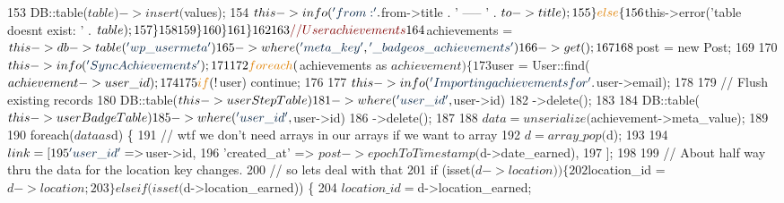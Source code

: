 \begin{DoxyCode}
153                             DB::table($table)->insert($values);
154                             $this->info(\textcolor{stringliteral}{'from: '} . $from->title . \textcolor{stringliteral}{' ----- '} . $to->title);
155                         \} \textcolor{keywordflow}{else} \{
156                             $this->error(\textcolor{stringliteral}{'table doesnt exist: '} . $table);
157                         \} 
158 
159                 \}
160             \}
161         \}
162 
163         \textcolor{comment}{// User achievements}
164         $achievements = $this->db->table(\textcolor{stringliteral}{'wp\_usermeta'})
165             ->where(\textcolor{stringliteral}{'meta\_key'}, \textcolor{stringliteral}{'\_badgeos\_achievements'})
166             ->get();
167 
168         $post = \textcolor{keyword}{new} Post;
169 
170         $this->info(\textcolor{stringliteral}{'Sync Achievements'});        
171 
172         \textcolor{keywordflow}{foreach} ($achievements as $achievement) \{
173             $user = User::find($achievement->user\_id);
174 
175             \textcolor{keywordflow}{if} (!$user) \textcolor{keywordflow}{continue};
176 
177             $this->info(\textcolor{stringliteral}{'Importing achievements for '} . $user->email);
178             
179             \textcolor{comment}{// Flush existing records}
180             DB::table($this->userStepTable)
181                 ->where(\textcolor{stringliteral}{'user\_id'}, $user->id)
182                 ->delete();
183 
184             DB::table($this->userBadgeTable)
185                 ->where(\textcolor{stringliteral}{'user\_id'}, $user->id)
186                 ->delete();
187 
188             $data = unserialize($achievement->meta\_value);
189 
190             \textcolor{keywordflow}{foreach}($data as $d) \{
191                 \textcolor{comment}{// wtf we don't need arrays in our arrays if we want to array}
192                 $d = array\_pop($d);
193 
194                 $link = [
195                     \textcolor{stringliteral}{'user\_id'}       => $user->id,
196                     \textcolor{stringliteral}{'created\_at'}    => $post->epochToTimestamp($d->date\_earned),
197                 ];
198 
199                 \textcolor{comment}{// About half way thru the data for the location key changes.}
200                 \textcolor{comment}{// so lets deal with that}
201                 \textcolor{keywordflow}{if} (isset($d->location)) \{
202                     $location\_id = $d->location;
203                 \} elseif (isset($d->location\_earned)) \{
204                     $location\_id = $d->location\_earned;

\end{DoxyCode}
